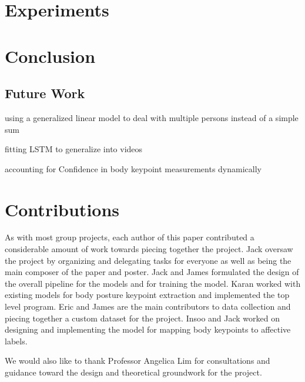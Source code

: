 \documentclass{article}
\begin{document}
\section{Experiments}

\section{Conclusion}

\subsection{Future Work}

using a generalized linear model to deal with multiple persons instead of a simple sum

fitting LSTM to generalize into videos

accounting for Confidence in body keypoint measurements dynamically

\section{Contributions}

As with most group projects, each author of this paper contributed a considerable amount of work towards piecing together the project. Jack oversaw the project by organizing and delegating tasks for everyone as well as being the main composer of the paper and poster. Jack and James formulated the design of the overall pipeline for the models and for training the model. Karan worked with existing models for body posture keypoint extraction and implemented the top level program. Eric and James are the main contributors to data collection and piecing together a custom dataset for the project. Insoo and Jack worked on designing and implementing the model for mapping body keypoints to affective labels.

We would also like to thank Professor Angelica Lim for consultations and guidance toward the design and theoretical groundwork for the project.



\end{document}

